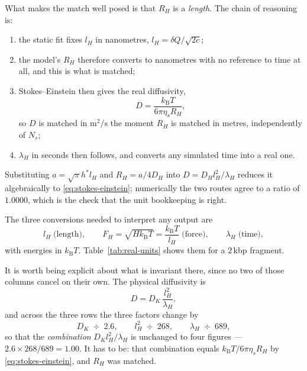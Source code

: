 \documentclass[11pt,a4paper]{report}
\newcommand{\kB}{k_\mathrm{B}}
\begin{document}
What makes the match well posed is that $R_H$ is a \emph{length}. The chain of
reasoning is:
\begin{enumerate}
  \item the static fit fixes $l_H$ in nanometres, $l_H = \delta Q/\sqrt{2c}$;
  \item the model's $R_H$ therefore converts to nanometres with no reference to
        time at all, and this is what is matched;
  \item Stokes--Einstein then gives the real diffusivity,
        \begin{equation}
          D = \frac{\kB T}{6\pi\eta_s R_H},
          \label{eq:stokes-einstein}
        \end{equation}
        so $D$ is matched in $\mathrm{m^2/s}$ the moment $R_H$ is matched in
        metres, independently of $N_s$;
  \item $\lambda_H$ in seconds then follows, and converts any simulated time into
        a real one.
\end{enumerate}
Substituting $a = \sqrt{\pi}h^{*}l_H$ and $R_H = a/4D_H$ into
$D = D_H l_H^{2}/\lambda_H$ reduces it algebraically to
\eqref{eq:stokes-einstein}; numerically the two routes agree to a ratio of
$1.0000$, which is the check that the unit bookkeeping is right.

The three conversions needed to interpret any output are
\begin{equation}
  l_H \;\text{(length)},
  \qquad
  F_H = \sqrt{H\kB T} = \frac{\kB T}{l_H} \;\text{(force)},
  \qquad
  \lambda_H \;\text{(time)},
\end{equation}
with energies in $\kB T$. Table~\ref{tab:real-units} shows them for a $2$\,kbp fragment.

It is worth being explicit about what is invariant there, since no two of those
columns cancel on their own. The physical diffusivity is
\begin{equation}
  D = D_K\,\frac{l_H^{2}}{\lambda_H},
\end{equation}
and across the three rows the three factors change by
\begin{equation}
  D_K \;\div\; 2.6,
  \qquad
  l_H^{2} \;\div\; 268,
  \qquad
  \lambda_H \;\div\; 689,
\end{equation}
so that the \emph{combination} $D_K l_H^{2}/\lambda_H$ is unchanged to four
figures --- $2.6\times268/689 = 1.00$. It has to be: that combination equals
$\kB T/6\pi\eta_s R_H$ by \eqref{eq:stokes-einstein}, and $R_H$ was matched.
\end{document}
